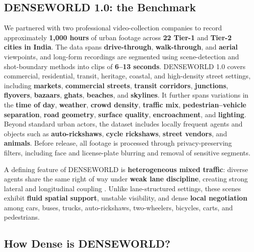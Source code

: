 \subsection{\textbf{DENSEWORLD 1.0}: the Benchmark}
\label{sec:denseworld_dataset}


We partnered with two professional video-collection companies to record approximately
\textbf{1,000 hours} of urban footage across \textbf{22 Tier-1} and \textbf{Tier-2 cities in India}. The data spans \textbf{drive-through}, \textbf{walk-through}, and \textbf{aerial} viewpoints, and long-form recordings are segmented using scene-detection and shot-boundary methods into clips of \textbf{6--13 seconds}. DENSEWORLD 1.0 covers commercial, residential, transit, heritage, coastal, and high-density street settings, including \textbf{markets}, \textbf{commercial streets}, \textbf{transit corridors}, \textbf{junctions}, \textbf{flyovers}, \textbf{bazaars}, \textbf{ghats}, \textbf{beaches}, and \textbf{skylines}. It further spans variations in the \textbf{time of day}, \textbf{weather}, \textbf{crowd density}, \textbf{traffic mix}, \textbf{pedestrian--vehicle separation}, \textbf{road geometry}, \textbf{surface quality}, \textbf{encroachment}, and \textbf{lighting}. Beyond standard urban actors, the dataset includes locally frequent agents and objects such as \textbf{auto-rickshaws}, \textbf{cycle rickshaws}, \textbf{street vendors}, and \textbf{animals}. Before release, all footage is processed through privacy-preserving filters, including face and license-plate blurring and removal of sensitive segments.

A defining feature of DENSEWORLD is \textbf{heterogeneous mixed traffic}: diverse agents share the same right of way under \textbf{weak lane discipline}, creating strong lateral and longitudinal coupling \cite{khan1999heterogeneous,papathanasopoulou2018weaklane,asaithambi2012mixedtraffic}. Unlike lane-structured settings, these scenes exhibit \textbf{fluid spatial support}, unstable visibility, and dense \textbf{local negotiation} among cars, buses, trucks, auto-rickshaws, two-wheelers, bicycles, carts, and pedestrians.









\subsection{\textbf{How Dense is DENSEWORLD?}}

